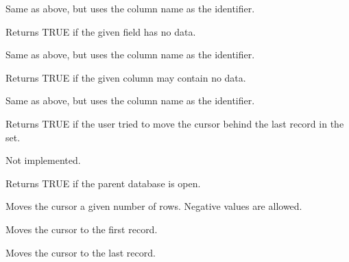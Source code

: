 Same as above, but uses the column name as the identifier.



Returns TRUE if the given field has no data.


Same as above, but uses the column name as the identifier.



Returns TRUE if the given column may contain no data.


Same as above, but uses the column name as the identifier.



Returns TRUE if the user tried to move the cursor behind the last record
in the set.



Not implemented.
  


Returns TRUE if the parent database is open.



Moves the cursor a given number of rows. Negative values are allowed.
  


Moves the cursor to the first record.
  


Moves the cursor to the last record.
  
\label{wxrecordsetmovenext}


